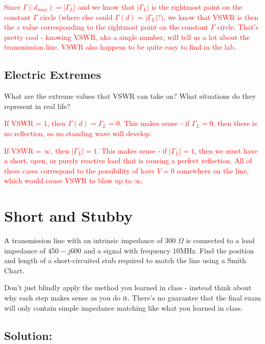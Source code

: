 \documentclass{article}
\begin{document}
\textcolor{red}{Since $\Gamma(d_{max}) = \vert \Gamma_L \vert$ and we know that $\vert \Gamma_L \vert$ is the rightmost point on the constant $\Gamma$ circle (where else could $\Gamma(d) = \vert \Gamma_L \vert$?), we know that VSWR is then the $z$ value corresponding to the rightmost point on the constant $\Gamma$ circle. That's pretty cool - knowing VSWR, aka a single number, will tell us a lot about the transmission line. VSWR also happens to be quite easy to find in the lab.}

\vfill

\subsection{Electric Extremes}

What are the extreme values that VSWR can take on? What situations do they represent in real life?

\textcolor{red}{If VSWR = 1, then $\Gamma(d) = \Gamma_L = 0$. This makes sense - if $\Gamma_L = 0$, then there is no reflection, so no standing wave will develop.}

\textcolor{red}{If VSWR = $\infty$, then $\vert \Gamma_L \vert = 1$. This makes sense - if $\vert \Gamma_L \vert = 1$, then we must have a short, open, or purely reactive load that is causing a perfect reflection. All of these cases correspond to the possibility of have $V = 0$ somewhere on the line, which would cause VSWR to blow up to $\infty$.}

\vfill
\newpage

\section{Short and Stubby}

A transmission line with an intrinsic impedance of 300 $\Omega$ is connected to a load impedance of $450-j600$ and a signal with frequency $10$MHz. Find the position and length of a short-circuited stub required to match the line using a Smith Chart.

Don't just blindly apply the method you learned in class - instead think about why each step makes sense as you do it. There's no guarantee that the final exam will only contain simple impedance matching like what you learned in class.

\subsection{Solution:}
\end{document}
